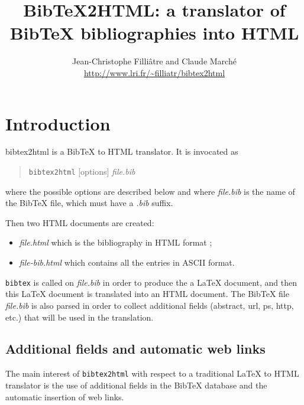 \documentclass[11pt,a4paper]{article}
\newcommand{\monurl}[2]{\url{#1}}
\begin{document}
\title{BibTeX2HTML: a translator of BibTeX bibliographies into HTML}
\author{Jean-Christophe Filli\^{a}tre and Claude March\'e \\
        \normalsize\monurl{http://www.lri.fr/~filliatr/bibtex2html}{http://www.lri.fr/\~{}filliatr/bibtex2html}}
\date{}
\maketitle

\tableofcontents


\section{Introduction}


bibtex2html is a BibTeX to HTML translator. It is invocated as 
\begin{quote}
\texttt{bibtex2html} [options] \textit{file.bib}
\end{quote}
where the possible 
options
are described below and where
\textit{file.bib} is the name of the BibTeX file, which must have a
\textit{.bib} suffix.

Then two HTML documents are created: 
\begin{itemize}
\item \textit{file.html} which is the bibliography in HTML format
;
\item \textit{file-bib.html} which contains all the entries in ASCII
  format.
\end{itemize}
\texttt{bibtex} is called on \textit{file.bib} in order to produce the
a LaTeX document, and then this LaTeX document is translated into an
HTML document.  The BibTeX file \textit{file.bib} is also parsed in
order to collect additional fields (abstract, url, ps, http, etc.)
that will be used in the translation.

\subsection{Additional fields and automatic web links}

The main interest of \texttt{bibtex2html} with respect to a
traditional LaTeX to HTML translator is the use of additional fields
in the BibTeX database and the automatic insertion of web
links.
\end{document}
